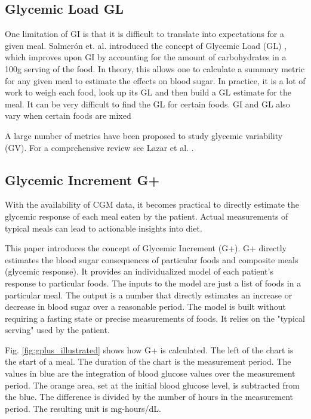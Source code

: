 \documentclass[conference]{IEEEtran}
\begin{document}
\subsection{Glycemic Load GL}

One limitation of GI is that it is difficult to translate into expectations for a given meal. Salmerón et. al. introduced the concept of Glycemic Load (GL) \cite{Salmeron_1997}, which improves upon GI by accounting for the amount of carbohydrates in a 100g serving of the food. In theory, this allows one to calculate a summary metric for any given meal to estimate the effects on blood sugar. In practice, it is a lot of work to weigh each food, look up its GL and then build a GL estimate for the meal. It can be very difficult to find the GL for certain foods. GI and GL also vary when certain foods are mixed \cite{Murillo_2022}

A large number of metrics have been proposed to study glycemic variability (GV). For a comprehensive review see Lazar et al. \cite{Lazar_2023}.

\subsection{Glycemic Increment G+}

With the availability of CGM data, it becomes practical to directly estimate the glycemic response of each meal eaten by the patient. Actual measurements of typical meals can lead to actionable insights into diet.

This paper introduces the concept of Glycemic Increment (G+). G+ directly estimates the blood sugar consequences of particular foods and composite meals (glycemic response). It provides an individualized model of each patient's response to particular foods. The inputs to the model are just a list of foods in a particular meal. The output is a number that directly estimates an increase or decrease in blood sugar over a reasonable period. The model is built without requiring a fasting state or precise measurements of foods. It relies on the "typical serving" used by the patient.

Fig. \ref{fig:gplus_illustrated} shows how G+ is calculated. The left of the chart is the start of a meal. The duration of the chart is the measurement period. The values in blue are the integration of blood glucose values over the measurement period. The orange area, set at the initial blood glucose level, is subtracted from the blue. The difference is divided by the number of hours in the measurement period. The resulting unit is mg-hours/dL.
\end{document}

